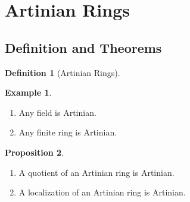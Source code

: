 \documentclass[a4paper]{book}
\theoremstyle{definition}
\newtheorem{definition}{Definition}[]
\newtheorem{example}{Example}[definition]
\newtheorem{proposition}[definition]{Proposition}
\begin{document}
\newpage
\section{Artinian Rings}

\subsection*{Definition and Theorems}

\begin{defbox}
    \begin{definition}[Artinian Rings]
        
    \end{definition}
\end{defbox}

\begin{exmbox}
    \begin{example}
        \begin{enumerate}
            \item Any field is Artinian.
            \item Any finite ring is Artinian.
        \end{enumerate}
    \end{example}
\end{exmbox}

\begin{thmbox}
    \begin{proposition}
        \begin{enumerate}
            \item A quotient of an Artinian ring is Artinian.
            \item A localization of an Artinian ring is Artinian.
        \end{enumerate}
    \end{proposition}
\end{thmbox}
\end{document}
